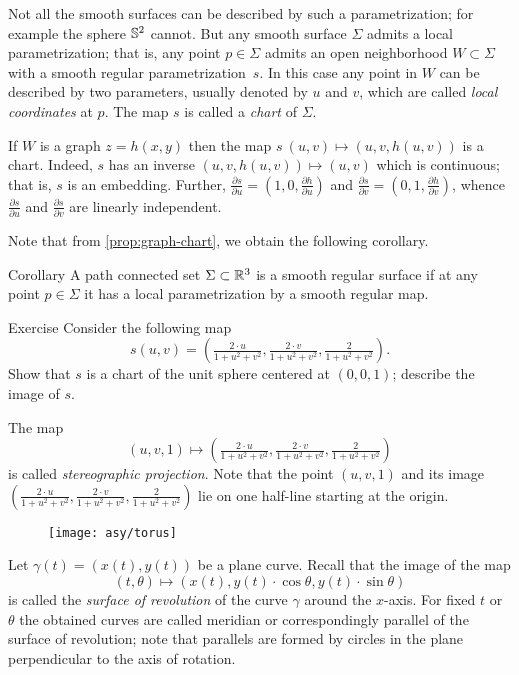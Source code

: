 Not all the smooth surfaces can be described by such a parametrization;
for example the sphere $\mathbb{S}^2$ cannot.
But any smooth surface $\Sigma$ admits a local parametrization; that is, any point $p\in\Sigma$ admits an open neighborhood $W\subset \Sigma$ with a smooth regular parametrization~$s$.
In this case any point in $W$ can be described by two parameters, usually denoted by $u$ and $v$, 
which are called \emph{local coordinates} at $p$.
The map $s$ is called a \emph{chart} of $\Sigma$.

If $W$ is a graph $z=h(x,y)$ then the map $s\:(u,v)\mapsto (u,v,h(u,v))$ is a chart.
Indeed, $s$ has an inverse $(u,v,h(u,v))\mapsto (u,v)$ which is continuous;
that is, $s$ is an embedding.
Further,
$\tfrac{\partial s}{\partial u}=(1,0,\tfrac{\partial h}{\partial u})$ and $\tfrac{\partial s}{\partial v}=(0,1,\tfrac{\partial h}{\partial v})$, whence $\tfrac{\partial s}{\partial u}$ and $\tfrac{\partial s}{\partial v}$ are linearly independent.

Note that from \ref{prop:graph-chart}, we obtain the following corollary.

\begin{thm}{Corollary}
A path connected set $\Sigma\subset \mathbb{R}^3$ is a smooth regular surface if at any point $p\in \Sigma$ it has a local parametrization by a smooth regular map.
\end{thm}


\begin{thm}{Exercise}\label{ex:inversion}
Consider the following map 
\[s(u,v)=(\tfrac{2\cdot u}{1+u^2+v^2},\tfrac{2\cdot v}{1+u^2+v^2},\tfrac{2}{1+u^2+v^2}).\]
Show that $s$ is a chart of the unit sphere centered at $(0,0,1)$; describe the image of $s$.
\end{thm}

The map 
\[(u,v,1)\mapsto (\tfrac{2\cdot u}{1+u^2+v^2},\tfrac{2\cdot v}{1+u^2+v^2},\tfrac{2}{1+u^2+v^2})\]
is called \emph{stereographic projection}. 
Note that the point $(u,v,1)$ and its image $(\tfrac{2\cdot u}{1+u^2+v^2},\tfrac{2\cdot v}{1+u^2+v^2},\tfrac{2}{1+u^2+v^2})$ lie on one half-line starting at the origin.

\begin{wrapfigure}{r}{40 mm}
\vskip-4mm
\centering
\texttt{[image: asy/torus]}
\vskip-3mm
\end{wrapfigure}

Let $\gamma(t)=(x(t),y(t))$ be a plane curve.
Recall that the image of the map 
\[(t,\theta)\mapsto (x(t), y(t)\cdot\cos\theta,y(t)\cdot\sin\theta)\] 
is called the \emph{surface of revolution} of the curve $\gamma$ around the $x$-axis.
For fixed $t$ or $\theta$ the obtained curves are called meridian or correspondingly parallel of the surface of revolution; note that parallels are formed by circles in the plane perpendicular to the axis of rotation.


